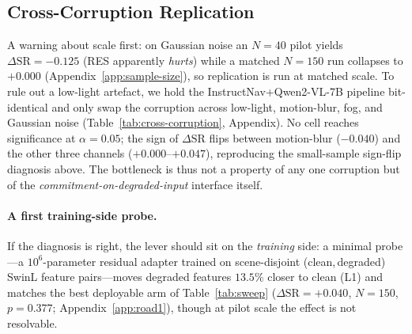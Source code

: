 \subsection{Cross-Corruption Replication}
\label{sec:cross-corruption}
A warning about scale first: on Gaussian noise an $N{=}40$ pilot yields
$\Delta\text{SR}{=}-0.125$ (RES apparently \emph{hurts}) while a matched
$N{=}150$ run collapses to $+0.000$ (Appendix~\ref{app:sample-size}), so
replication is run at matched scale. To rule out a low-light artefact, we
hold the InstructNav+Qwen2-VL-7B pipeline bit-identical and only swap the
corruption across low-light, motion-blur, fog, and Gaussian noise
(Table~\ref{tab:cross-corruption}, Appendix). No cell reaches significance at $\alpha{=}0.05$; the sign of
$\Delta\text{SR}$ flips between motion-blur ($-0.040$) and the other three
channels ($+0.000$--$+0.047$), reproducing the small-sample sign-flip
diagnosis above. The bottleneck is thus not a property of any one
corruption but of the \emph{commitment-on-degraded-input} interface
itself.

\paragraph{A first training-side probe.}
If the diagnosis is right, the lever should sit on the \emph{training}
side: a minimal probe---a $10^{6}$-parameter
residual adapter trained on scene-disjoint (clean,\,degraded) SwinL
feature pairs---moves degraded features $13.5\%$ closer to clean (L1)
and matches the best deployable arm of Table~\ref{tab:sweep}
($\Delta\text{SR}{=}{+}0.040$, $N{=}150$, $p{=}0.377$;
Appendix~\ref{app:road1}), though at pilot scale the effect is not
resolvable.
